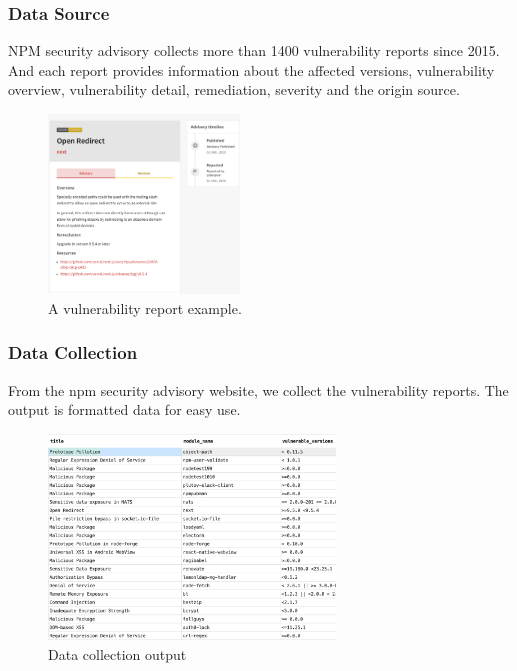 \documentclass[notheorems, aspectratio=54]{beamer}
\begin{document}
\begin{frame}
    \frametitle{Data Source}
    NPM security advisory collects more than 1400 vulnerability reports since 2015.
    And each report provides information about the affected versions,  vulnerability overview, vulnerability detail, remediation, severity and the origin source.
    \begin{figure}[htbp]
        \centering
            \includegraphics[width=2.0in]{./figures/advisory.png}
        \centering
        \caption{A vulnerability report example.}
    \end{figure}
\end{frame}

\begin{frame}
    \frametitle{Data Collection}
    From the npm security advisory website, we collect the vulnerability reports. The output is formatted data for easy use. 
    \begin{figure}[htbp]
        \centering
            \includegraphics[width=3.0in]{./figures/sqlite.png}
        \centering
        \caption{Data collection output}
    \end{figure}
\end{frame}
\end{document}
